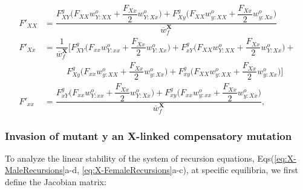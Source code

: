 \documentclass{article}
\begin{document}
\begin{subequations}\label{eq:X-FemaleRecursions} 
	\begin{align} 
		F'_{XX} &= \dfrac{ F_{XY}^g \bigg(F_{XX} w^{o}_{Y:XX} + \dfrac{F_{Xx}}{2} w^{o}_{Y:Xx} \bigg) + F_{Xy}^g \bigg(F_{XX} w^{o}_{y:XX} + \dfrac{F_{Xx}}{2} w^{o}_{y:Xx} \bigg)}{\overline{w}^{\mathbf{X}}_{f}} \label{eq:X-XxRec1} \\ 
		F'_{Xx} &= \dfrac{1}{\overline{w}^{\mathbf{X}}_{f}} \Bigg[F_{XY}^g \bigg(F_{xx} w^{o}_{Y:xx} + \dfrac{F_{Xx}}{2} w^{o}_{Y:Xx} \bigg) + F_{xY}^g \bigg(F_{XX} w^{o}_{Y:XX} + \dfrac{F_{Xx}}{2} w^{o}_{Y:Xx} \bigg) + \nonumber\\
		&~~~~~~~~~~~~F_{Xy}^g \bigg(F_{xx} w^{o}_{y:XX} + \dfrac{F_{Xx}}{2} w^{o}_{y:Xx} \bigg) + F_{xy}^g \bigg(F_{XX} w^{o}_{y:XX} + \dfrac{F_{Xx}}{2} w^{o}_{y:Xx} \bigg) \Bigg]  \label{eq:X-XxRec2} \\ 
		F'_{xx} &= \dfrac{ F_{xY}^g \bigg(F_{xx} w^{o}_{Y:xx} + \dfrac{F_{Xx}}{2} w^{o}_{Y:Xx} \bigg) + F_{xy}^g \bigg(F_{xx} w^{o}_{y:xx} + \dfrac{F_{Xx}}{2} w^{o}_{y:Xx} \bigg)}{\overline{w}^{\mathbf{X}}_{f}}, \label{eq:X-xxRec3}
	\end{align}
\end{subequations}


\subsubsection{Invasion of mutant y an X-linked compensatory mutation}

To analyze the linear stability of the system of recursion equations, Eqs(\ref{eq:X-MaleRecursions}a-d, \ref{eq:X-FemaleRecursions}a-c), at specific equilibria, we first define the Jacobian matrix:
\end{document}
